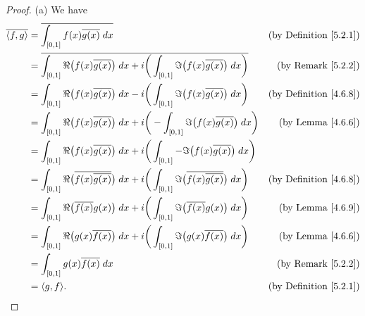 \begin{proof}{(a)}
    We have
    \begin{align*}
        \overline{\inner*{f, g}} & = \overline{\int_{[0, 1]} f(x) \overline{g(x)} \; dx}                                                                                               & \text{(by Definition \ref{5.2.1})} \\
                                 & = \overline{\int_{[0, 1]} \Re\big(f(x) \overline{g(x)}\big) \; dx + i \bigg(\int_{[0, 1]} \Im\big(f(x) \overline{g(x)}\big) \; dx\bigg)}            & \text{(by Remark \ref{5.2.2})}     \\
                                 & = \int_{[0, 1]} \Re\big(f(x) \overline{g(x)}\big) \; dx - i \bigg(\int_{[0, 1]} \Im\big(f(x) \overline{g(x)}\big) \; dx\bigg)                       & \text{(by Definition \ref{4.6.8})} \\
                                 & = \int_{[0, 1]} \Re\big(f(x) \overline{g(x)}\big) \; dx + i \bigg(-\int_{[0, 1]} \Im\big(f(x) \overline{g(x)}\big) \; dx\bigg)                      & \text{(by Lemma \ref{4.6.6})}      \\
                                 & = \int_{[0, 1]} \Re\big(f(x) \overline{g(x)}\big) \; dx + i \bigg(\int_{[0, 1]} -\Im\big(f(x) \overline{g(x)}\big) \; dx\bigg)                                                           \\
                                 & = \int_{[0, 1]} \Re\big(\overline{f(x) \overline{g(x)}}\big) \; dx + i \bigg(\int_{[0, 1]} \Im\big(\overline{f(x) \overline{g(x)}}\big) \; dx\bigg) & \text{(by Definition \ref{4.6.8})} \\
                                 & = \int_{[0, 1]} \Re\big(\overline{f(x)} g(x)\big) \; dx + i \bigg(\int_{[0, 1]} \Im\big(\overline{f(x)} g(x)\big) \; dx\bigg)                       & \text{(by Lemma \ref{4.6.9})}      \\
                                 & = \int_{[0, 1]} \Re\big(g(x) \overline{f(x)}\big) \; dx + i \bigg(\int_{[0, 1]} \Im\big(g(x) \overline{f(x)}\big) \; dx\bigg)                       & \text{(by Lemma \ref{4.6.6})}      \\
                                 & = \int_{[0, 1]} g(x) \overline{f(x)} \; dx                                                                                                          & \text{(by Remark \ref{5.2.2})}     \\
                                 & = \inner*{g, f}.                                                                                                                                    & \text{(by Definition \ref{5.2.1})}
    \end{align*}
\end{proof}

